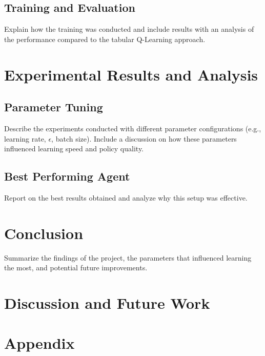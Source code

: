 \documentclass[a4paper,12pt]{article}
\begin{document}
\subsection{Training and Evaluation}
Explain how the training was conducted and include results with an analysis of the performance compared to the tabular Q-Learning approach.

\section{Experimental Results and Analysis}
\subsection{Parameter Tuning}
Describe the experiments conducted with different parameter configurations (e.g., learning rate, \(\epsilon\), batch size). Include a discussion on how these parameters influenced learning speed and policy quality.

\subsection{Best Performing Agent}
Report on the best results obtained and analyze why this setup was effective.

\section{Conclusion}
Summarize the findings of the project, the parameters that influenced learning the most, and potential future improvements.





\section{Discussion and Future Work}

\clearpage

\appendix
\section*{Appendix}
\end{document}
